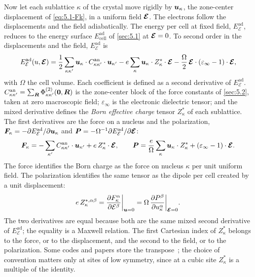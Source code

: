 Now let each sublattice $\kappa$ of the crystal move rigidly by $\bm{u}_\kappa$, the zone-center displacement of \cref{eq:5.1-Fk}, in a uniform field $\bm{\mathcal{E}}$. The electrons follow the displacements and the field adiabatically. The energy per cell at fixed field, $E^{\mathrm{ad}}_{\mathcal{E}}$, reduces to the energy surface $E^{\mathrm{ad}}_{\mathrm{cell}}$ of \cref{sec:5.1} at $\bm{\mathcal{E}} = 0$. To second order in the displacements and the field, $E^{\mathrm{ad}}_{\mathcal{E}}$ is
\begin{equation}
  E^{\mathrm{ad}}_{\mathcal{E}}(u,\bm{\mathcal{E}}) = \frac12\sum_{\kappa\kappa'}\bm{u}_\kappa\cdot C^{\mathrm{an}}_{\kappa\kappa'}\cdot\bm{u}_{\kappa'} - e\sum_\kappa\bm{u}_\kappa\cdot Z^*_\kappa\cdot\bm{\mathcal{E}} - \frac\Omega2\,\bm{\mathcal{E}}\cdot(\varepsilon_\infty - 1)\cdot\bm{\mathcal{E}} ,
  \label{eq:5.5-U}
\end{equation}
with $\Omega$ the cell volume. Each coefficient is defined as a second derivative of $E^{\mathrm{ad}}_{\mathcal{E}}$. $C^{\mathrm{an}}_{\kappa\kappa'} = \sum_{\bm{R}}\Phi^{(2)}_{\kappa\kappa'}(\bm{0},\bm{R})$ is the zone-center block of the force constants of \cref{sec:5.2}, taken at zero macroscopic field; $\varepsilon_\infty$ is the electronic dielectric tensor; and the mixed derivative defines the \emph{Born effective charge} tensor $Z^*_\kappa$ of each sublattice. The first derivatives are the force on a nucleus and the polarization, $\bm{F}_\kappa = -\partial E^{\mathrm{ad}}_{\mathcal{E}}/\partial\bm{u}_\kappa$ and $\bm{P} = -\Omega^{-1}\partial E^{\mathrm{ad}}_{\mathcal{E}}/\partial\bm{\mathcal{E}}$:
\begin{equation}
  \bm{F}_\kappa = -\sum_{\kappa'}C^{\mathrm{an}}_{\kappa\kappa'}\cdot\bm{u}_{\kappa'} + e\,Z^*_\kappa\cdot\bm{\mathcal{E}} , \qquad
  \bm{P} = \frac{e}{\Omega}\sum_\kappa\bm{u}_\kappa\cdot Z^*_\kappa + (\varepsilon_\infty - 1)\cdot\bm{\mathcal{E}} .
  \label{eq:5.5-FP}
\end{equation}
The force identifies the Born charge as the force on nucleus $\kappa$ per unit uniform field. The polarization identifies the same tensor as the dipole per cell created by a unit displacement:
\begin{equation}
  e\,Z^{*,\alpha\beta}_\kappa = \frac{\partial F^\alpha_\kappa}{\partial\mathcal{E}^\beta}\bigg|_{\bm{u} = 0} = \Omega\,\frac{\partial P^\beta}{\partial u^\alpha_\kappa}\bigg|_{\bm{\mathcal{E}} = 0} .
  \label{eq:5.5-Z}
\end{equation}
The two derivatives are equal because both are the same mixed second derivative of $E^{\mathrm{ad}}_{\mathcal{E}}$; the equality is a Maxwell relation. The first Cartesian index of $Z^*_\kappa$ belongs to the force, or to the displacement, and the second to the field, or to the polarization. Some codes and papers store the transpose~\cite[Eqs.~(89)--(91)]{baroni2001phonons}; the choice of convention matters only at sites of low symmetry, since at a cubic site $Z^*_\kappa$ is a multiple of the identity.

